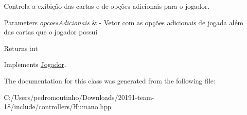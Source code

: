 Controla a exibição das cartas e de opções adicionais para o jogador. 


\begin{DoxyParams}{Parameters}
{\em opcoes\+Adicionais} & -\/ Vetor com as opções adicionais de jogada além das cartas que o jogador possui \\
\hline
\end{DoxyParams}
\begin{DoxyReturn}{Returns}
int 
\end{DoxyReturn}


Implements \mbox{\hyperlink{class_jogador_a8af760d8531f7d4e78fc767adcff0cb6}{Jogador}}.



The documentation for this class was generated from the following file\+:\begin{DoxyCompactItemize}
\item 
C\+:/\+Users/pedromoutinho/\+Downloads/20191-\/team-\/18/include/controllers/Humano.\+hpp\end{DoxyCompactItemize}
